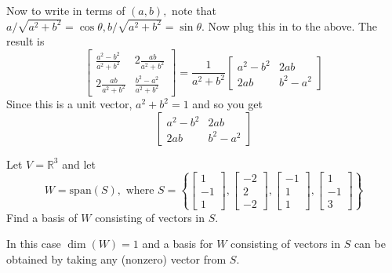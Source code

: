 \documentclass{ximera}
\begin{document}
\begin{problem}
\begin{hint}
Now to write in terms of $\left( a,b\right) ,$ note that $a/\sqrt{a^{2}+b^{2}
}=\cos \theta ,b/\sqrt{a^{2}+b^{2}}=\sin \theta .$ Now plug this in to the
above. The result is
\[
\left[
\begin{array}{cc}
\frac{a^{2}-b^{2}}{a^{2}+b^{2}} & 2\frac{ab}{a^{2}+b^{2}} \\
2\frac{ab}{a^{2}+b^{2}} & \frac{b^{2}-a^{2}}{a^{2}+b^{2}}
\end{array}
\right] =\frac{1}{a^{2}+b^{2}}\left[
\begin{array}{cc}
a^{2}-b^{2} & 2ab \\
2ab & b^{2}-a^{2}
\end{array}
\right]
\]
Since this is a unit vector, $a^{2}+b^{2}=1$ and so you get
\[
\left[
\begin{array}{cc}
a^{2}-b^{2} & 2ab \\
2ab & b^{2}-a^{2}
\end{array}
\right]
\]
\end{hint}
\end{problem}

\begin{problem}\label{prb:6.27}
Let $V=\mathbb{R}^{3}$ and let
\begin{equation*}
W=\mbox{span} \left( S \right),  \mbox{ where } S=\left\{ \left[
\begin{array}{r}
1 \\
-1 \\
1
\end{array}
\right] ,\left[
\begin{array}{r}
-2 \\
2 \\
-2
\end{array}
\right],\left[
\begin{array}{r}
-1 \\
1 \\
1
\end{array}
\right],\left[
\begin{array}{r}
1 \\
-1 \\
3
\end{array}
\right] \right\}
\end{equation*}
Find a basis of $W$ consisting of vectors in $S$.

\begin{hint}
In this case $\dim (W)=1$ and a basis for $W$ consisting of vectors in $S$ can be obtained by taking any (nonzero) vector from $S$.
\end{hint}
\end{problem}
\end{document}
